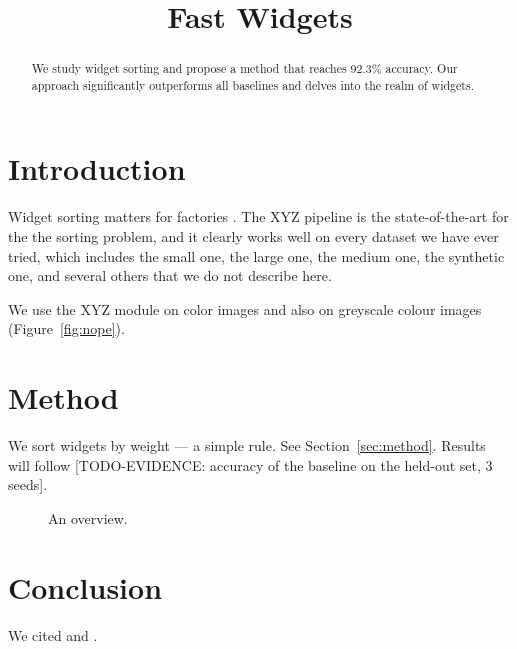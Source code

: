 \documentclass{article}
\begin{document}
\title{Fast Widgets}
\maketitle

\begin{abstract}
We study widget sorting and propose a method that reaches 92.3\% accuracy. Our approach significantly outperforms all baselines and delves into the realm of widgets.
\end{abstract}

\section{Introduction}
Widget sorting matters for factories \cite{smith2020}. The XYZ pipeline is the state-of-the-art for the the sorting problem, and it clearly works well on every dataset we have ever tried, which includes the small one, the large one, the medium one, the synthetic one, and several others that we do not describe here.

We use the XYZ module on color images and also on greyscale colour images (Figure~\ref{fig:nope}).

\section{Method}
We sort widgets by weight --- a simple rule. See Section~\ref{sec:method}. Results will follow [TODO-EVIDENCE: accuracy of the baseline on the held-out set, 3 seeds].

\begin{figure}
\centering
\caption{An overview.}
\label{fig:unused}
\end{figure}

\section{Conclusion}
We cited \cite{missing2020} and \cite{jones2021}.



\end{document}
